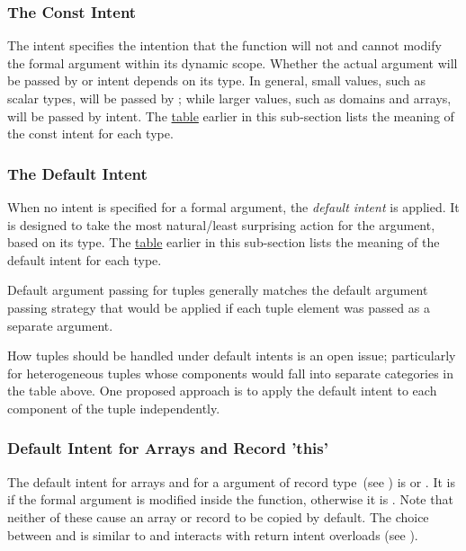 \subsubsection{The Const Intent}
\label{The_Const_Intent}

The  intent specifies the intention that the function will
not and cannot modify the formal argument within its dynamic scope.
Whether the actual argument will be passed by  or
 intent depends on its type.  In general, small values,
such as scalar types, will be passed by ; while larger
values, such as domains and arrays, will be passed by 
intent.  The \hyperref[Abstract_Intents_Table]{table} earlier in this
sub-section lists the meaning of the const intent for each type.


\subsubsection{The Default Intent}
\label{The_Default_Intent}

When no intent is specified for a formal argument, the \emph{default
intent} is applied.  It is designed to take the most natural/least
surprising action for the argument, based on its type. The
\hyperref[Abstract_Intents_Table]{table}
earlier in this sub-section lists the meaning of the default
intent for each type.

Default argument passing for tuples generally matches the default
argument passing strategy that would be applied if each tuple element was
passed as a separate argument.

\begin{openissue}
How tuples should be handled under default intents is an open issue;
particularly for heterogeneous tuples whose components would fall into
separate categories in the table above.  One proposed approach is to
apply the default intent to each component of the tuple independently.
\end{openissue}

\subsubsection{Default Intent for Arrays and Record 'this'}
\label{Default_Intent_for_Arrays_and_Record_this}

The default intent for arrays and for a  argument of record
type~(see ) is  or .
It is  if the formal argument is modified inside the
function, otherwise it is .  Note that neither of these
cause an array or record to be copied by default.  The choice between
 and  is similar to and interacts with return
intent overloads (see ).

